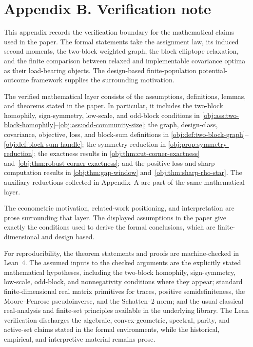 \section{Appendix B. Verification note}

This appendix records the verification boundary for the mathematical claims used in the paper. The formal statements take the assignment law, its induced second moments, the two-block weighted graph, the block elliptope relaxation, and the finite comparison between relaxed and implementable covariance optima as their load-bearing objects. The design-based finite-population potential-outcome framework supplies the surrounding motivation.

The verified mathematical layer consists of the assumptions, definitions, lemmas, and theorems stated in the paper. In particular, it includes the two-block homophily, sign-symmetry, low-scale, and odd-block conditions in \cref{obj:ass:two-block-homophily}--\cref{obj:ass:odd-community-size}; the graph, design-class, covariance, objective, loss, and block-sum definitions in \cref{obj:def:two-block-graph}--\cref{obj:def:block-sum-handle}; the symmetry reduction in \cref{obj:prop:symmetry-reduction}; the exactness results in \cref{obj:thm:cut-corner-exactness} and~\cref{obj:thm:robust-corner-exactness}; and the positive-loss and sharp-computation results in \cref{obj:thm:gap-window} and~\cref{obj:thm:sharp-rho-star}. The auxiliary reductions collected in Appendix~A are part of the same mathematical layer.

The econometric motivation, related-work positioning, and interpretation are prose surrounding that layer. The displayed assumptions in the paper give exactly the conditions used to derive the formal conclusions, which are finite-dimensional and design based.

For reproducibility, the theorem statements and proofs are machine-checked in Lean~4. The assumed inputs to the checked arguments are the explicitly stated mathematical hypotheses, including the two-block homophily, sign-symmetry, low-scale, odd-block, and nonnegativity conditions where they appear; standard finite-dimensional real matrix primitives for traces, positive semidefiniteness, the Moore--Penrose pseudoinverse, and the Schatten--2 norm; and the usual classical real-analysis and finite-set principles available in the underlying library. The Lean verification discharges the algebraic, convex-geometric, spectral, parity, and active-set claims stated in the formal environments, while the historical, empirical, and interpretive material remains prose.

